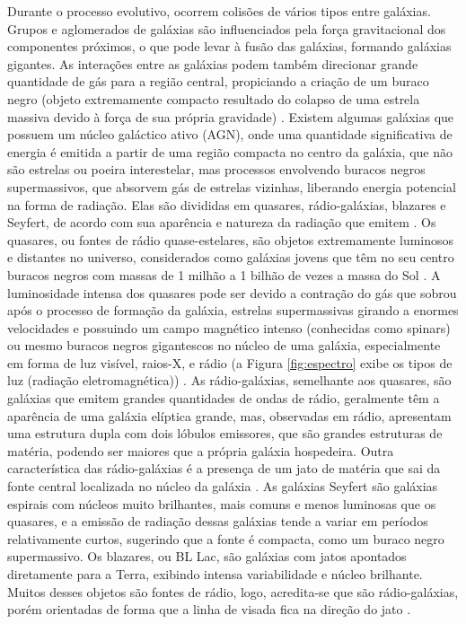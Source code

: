 Durante o processo evolutivo, ocorrem colisões de vários tipos entre galáxias. Grupos e aglomerados de galáxias são influenciados pela força gravitacional dos componentes próximos, o que pode levar à fusão das galáxias, formando galáxias gigantes. As interações entre as galáxias podem também direcionar grande quantidade de gás para a região central, propiciando a criação de um buraco negro (objeto extremamente compacto resultado do colapso de uma estrela massiva devido à força de sua própria gravidade) \cite{2003Wuensche}. Existem algumas galáxias que possuem um núcleo galáctico ativo (AGN), onde uma quantidade significativa de energia é emitida a partir de uma região compacta no centro da galáxia, que não são estrelas ou poeira interestelar, mas processos envolvendo buracos negros supermassivos, que absorvem gás de estrelas vizinhas, liberando energia potencial na forma de radiação. Elas são divididas em quasares, rádio-galáxias, blazares e Seyfert, de acordo com sua aparência e natureza da radiação que emitem \cite{2022gastao}. Os quasares, ou fontes de rádio quase-estelares, são objetos extremamente luminosos e distantes no universo, considerados como galáxias jovens que têm no seu centro buracos negros com massas de 1 milhão a 1 bilhão de vezes a massa do Sol \cite{2023Muller}. A luminosidade intensa dos quasares pode ser devido a  contração do gás que sobrou após o processo de formação da galáxia, estrelas supermassivas girando a enormes velocidades e possuindo um campo magnético intenso (conhecidas como spinars) ou mesmo buracos negros gigantescos no núcleo de uma galáxia, especialmente em forma de luz visível, raios-X, e rádio (a Figura \ref{fig:espectro} exibe os tipos de luz (radiação eletromagnética)) \cite{2003Wuensche}. As rádio-galáxias, semelhante aos quasares, são galáxias que emitem grandes quantidades de ondas de rádio, geralmente têm a aparência de uma galáxia elíptica grande, mas, observadas em rádio, apresentam uma estrutura dupla com dois lóbulos emissores, que são grandes estruturas de matéria, podendo ser maiores que a própria galáxia hospedeira. Outra característica das rádio-galáxias é a presença de um jato de matéria que sai da fonte central localizada no núcleo da galáxia \cite{2003Wuensche,2010arnab}. As galáxias Seyfert são galáxias espirais com núcleos muito brilhantes, mais comuns e menos luminosas que os quasares, e a emissão de radiação dessas galáxias tende a variar em períodos relativamente curtos, sugerindo que a fonte é compacta, como um buraco negro supermassivo. Os blazares, ou BL Lac, são galáxias com jatos apontados diretamente para a Terra, exibindo intensa variabilidade e núcleo brilhante. Muitos desses objetos são fontes de rádio, logo, acredita-se que são rádio-galáxias, porém orientadas de forma que a linha de visada fica na direção do jato \cite{2022gastao}. 


